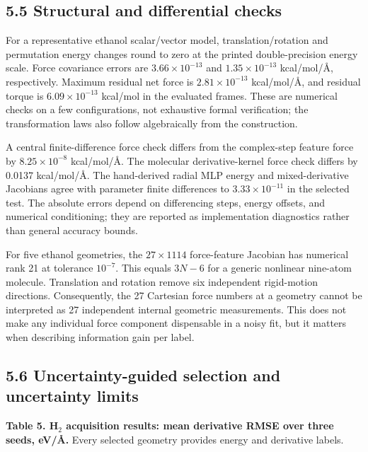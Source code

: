 \documentclass[
  11pt,
  a4paper,
]{article}
\begin{document}
\hypertarget{structural-and-differential-checks}{%
\subsection{5.5 Structural and differential
checks}\label{structural-and-differential-checks}}

For a representative ethanol scalar/vector model, translation/rotation
and permutation energy changes round to zero at the printed
double-precision energy scale. Force covariance errors are
\(3.66\times10^{-13}\) and \(1.35\times10^{-13}\) kcal/mol/Å,
respectively. Maximum residual net force is \(2.81\times10^{-13}\)
kcal/mol/Å, and residual torque is \(6.09\times10^{-13}\) kcal/mol in
the evaluated frames. These are numerical checks on a few
configurations, not exhaustive formal verification; the transformation
laws also follow algebraically from the construction.

A central finite-difference force check differs from the complex-step
feature force by \(8.25\times10^{-8}\) kcal/mol/Å. The molecular
derivative-kernel force check differs by 0.0137 kcal/mol/Å. The
hand-derived radial MLP energy and mixed-derivative Jacobians agree with
parameter finite differences to \(3.33\times10^{-11}\) in the selected
test. The absolute errors depend on differencing steps, energy offsets,
and numerical conditioning; they are reported as implementation
diagnostics rather than general accuracy bounds.

For five ethanol geometries, the \(27\times1114\) force-feature Jacobian
has numerical rank 21 at tolerance \(10^{-7}\). This equals \(3N-6\) for
a generic nonlinear nine-atom molecule. Translation and rotation remove
six independent rigid-motion directions. Consequently, the 27 Cartesian
force numbers at a geometry cannot be interpreted as 27 independent
internal geometric measurements. This does not make any individual force
component dispensable in a noisy fit, but it matters when describing
information gain per label.

\hypertarget{uncertainty-guided-selection-and-uncertainty-limits}{%
\subsection{5.6 Uncertainty-guided selection and uncertainty
limits}\label{uncertainty-guided-selection-and-uncertainty-limits}}


\textbf{Table 5. H\(_2\) acquisition results: mean derivative RMSE over
three seeds, eV/Å.} Every selected geometry provides energy and
derivative labels.
\end{document}
